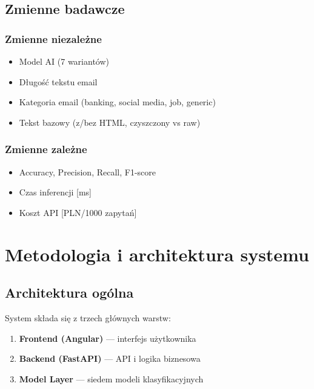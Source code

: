 \documentclass[11pt]{extreport}
\begin{document}
\section{Zmienne badawcze}
\label{sec:zmienne}

\subsection{Zmienne niezależne}
\begin{itemize}
    \item Model AI (7 wariantów)
    \item Długość tekstu email
    \item Kategoria email (banking, social media, job, generic)
    \item Tekst bazowy (z/bez HTML, czyszczony vs raw)
\end{itemize}

\subsection{Zmienne zależne}
\begin{itemize}
    \item Accuracy, Precision, Recall, F1-score
    \item Czas inferencji [ms]
    \item Koszt API [PLN/1000 zapytań]
\end{itemize}

\chapter{Metodologia i architektura systemu}
\label{ch:metodologia}

\section{Architektura ogólna}
\label{sec:architektura}

System składa się z trzech głównych warstw:

\begin{enumerate}
    \item \textbf{Frontend (Angular)} --- interfejs użytkownika
    \item \textbf{Backend (FastAPI)} --- API i logika biznesowa
    \item \textbf{Model Layer} --- siedem modeli klasyfikacyjnych
\end{enumerate}
\end{document}
